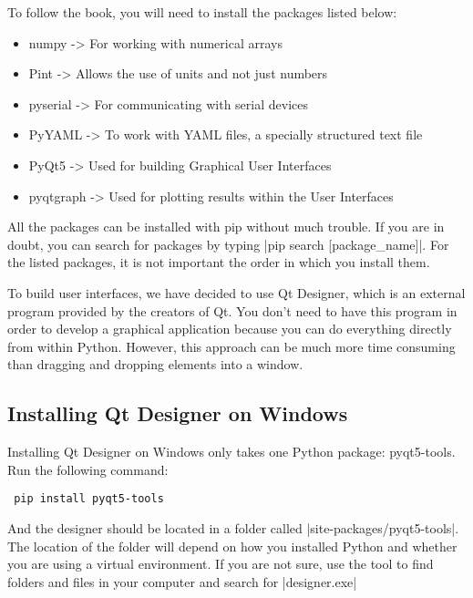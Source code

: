 To follow the book, you will need to install the packages listed below:
\begin{itemize}
 \item numpy -> For working with numerical arrays
 \item Pint -> Allows the use of units and not just numbers
 \item pyserial -> For communicating with serial devices
 \item PyYAML -> To work with YAML files, a specially structured text file
 \item PyQt5 -> Used for building Graphical User Interfaces
 \item pyqtgraph -> Used for plotting results within the User Interfaces
\end{itemize}


All the packages can be installed with pip without much trouble. If you are in doubt, you can search for packages by typing |pip search [package_name]|. For the listed packages, it is not important the order in which you install them.

To build user interfaces, we have decided to use Qt Designer, which is an external program provided by the creators of Qt. You don’t need to have this program in order to develop a graphical application because you can do everything directly from within Python. However, this approach can be much more time consuming than dragging and dropping elements into a window.

\subsection{Installing Qt Designer on Windows}
Installing Qt Designer on Windows only takes one Python package: pyqt5-tools. Run the following command:

\begin{verbatim}
 pip install pyqt5-tools
\end{verbatim}

And the designer should be located in a folder called |site-packages/pyqt5-tools|. The location of the folder will depend on how you installed Python and whether you are using a virtual environment. If you are not sure, use the tool to find folders and files in your computer and search for |designer.exe|

